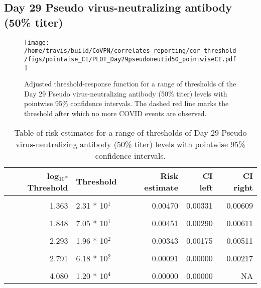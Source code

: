 \documentclass[]{book}
\theoremstyle{definition}
\theoremstyle{definition}
\theoremstyle{definition}
\newcommand{\1}{\mathbbm{1}}
\begin{document}
\newpage

\newpage

\newpage

\hypertarget{day-29-pseudo-virus-neutralizing-antibody-50-titer}{%
\subsection{Day 29 Pseudo virus-neutralizing antibody (50\% titer)}\label{day-29-pseudo-virus-neutralizing-antibody-50-titer}}

\begin{figure}[H]
\centering
\texttt{[image: /home/travis/build/CoVPN/correlates\_reporting/cor\_threshold/figs/pointwise\_CI/PLOT\_Day29pseudoneutid50\_pointwiseCI.pdf]}
\caption{Adjusted threshold-response function for a range of thresholds of the
  Day 29 Pseudo virus-neutralizing antibody (50\% titer) levels with pointwise 95\% confidence intervals. The dashed red line marks the threshold after which no more COVID events are observed. }
\end{figure}
\begin{table}[!h]

\caption{\label{tab:unnamed-chunk-359}Table of risk estimates for a range of thresholds of Day 29 Pseudo virus-neutralizing antibody (50\% titer) levels with pointwise 95\% confidence intervals.}
\centering
\begin{tabular}[t]{rlrrr}
\toprule
log$_{10}$-Threshold & Threshold & Risk estimate & CI left & CI right\\
\midrule
\cellcolor{gray!6}{0.699} & \cellcolor{gray!6}{5.00 * 10$^0$} & \cellcolor{gray!6}{0.00585} & \cellcolor{gray!6}{0.00442} & \cellcolor{gray!6}{0.00727}\\
1.363 & 2.31 * 10$^1$ & 0.00470 & 0.00331 & 0.00609\\
\cellcolor{gray!6}{1.628} & \cellcolor{gray!6}{4.25 * 10$^1$} & \cellcolor{gray!6}{0.00469} & \cellcolor{gray!6}{0.00318} & \cellcolor{gray!6}{0.00619}\\
1.848 & 7.05 * 10$^1$ & 0.00451 & 0.00290 & 0.00611\\
\cellcolor{gray!6}{2.078} & \cellcolor{gray!6}{1.20 * 10$^2$} & \cellcolor{gray!6}{0.00399} & \cellcolor{gray!6}{0.00237} & \cellcolor{gray!6}{0.00561}\\
2.293 & 1.96 * 10$^2$ & 0.00343 & 0.00175 & 0.00511\\
\cellcolor{gray!6}{2.537} & \cellcolor{gray!6}{3.44 * 10$^2$} & \cellcolor{gray!6}{0.00143} & \cellcolor{gray!6}{0.00016} & \cellcolor{gray!6}{0.00270}\\
2.791 & 6.18 * 10$^2$ & 0.00091 & 0.00000 & 0.00217\\
\cellcolor{gray!6}{3.109} & \cellcolor{gray!6}{1.29 * 10$^3$} & \cellcolor{gray!6}{0.00199} & \cellcolor{gray!6}{0.00000} & \cellcolor{gray!6}{0.00481}\\
4.080 & 1.20 * 10$^4$ & 0.00000 & 0.00000 & NA\\
\bottomrule
\end{tabular}
\end{table}
\end{document}
